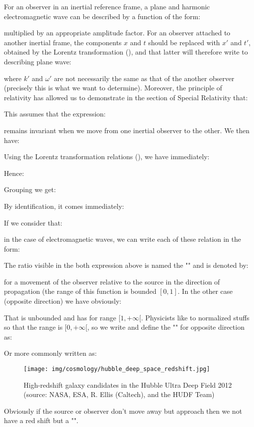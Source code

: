 	For an observer in an inertial reference frame, a plane and harmonic electromagnetic wave can be described by a function of the form:
	
	multiplied by an appropriate amplitude factor. For an observer attached to another inertial frame, the components $x$ and $t$ should be replaced with $x'$ and $t'$, obtained by the Lorentz transformation (), and that latter will therefore write to describing plane wave:
	
	where $k'$ and $\omega'$ are not necessarily the same as that of the another observer (precisely this is what we want to determine). Moreover, the principle of relativity has allowed us to demonstrate in the section of Special Relativity that:
	
	This assumes that the expression:
	
	remains invariant when we move from one inertial observer to the other. We then have:
	
	Using the Lorentz transformation relations (), we have immediately:
	
	Hence:
	
	Grouping we get:
	
	By identification, it comes immediately:
	
	If we consider that:
	
	in the case of electromagnetic waves, we can write each of these relation in the form:
	
	The ratio visible in the both expression above is named the "" and is denoted by:
	
	for a movement of the observer relative to the source in the direction of propagation (the range of this function is bounded $[0,1]$. In the other case (opposite direction) we have obviously:
	
	That is unbounded and has for range $[1,+\infty[$. Physicists like to normalized stuffs so that the range is $[0,+\infty[$, so we write and define the "" for opposite direction as:
	
	Or more commonly written as:
	
	
	\begin{figure}[H]
		\centering
		\texttt{[image: img/cosmology/hubble\_deep\_space\_redshift.jpg]}
		\caption[High-redshift galaxy candidates in the Hubble Ultra Deep Field 2012]{High-redshift galaxy candidates in the Hubble Ultra Deep Field 2012 (source: NASA, ESA, R. Ellis (Caltech), and the HUDF Team)}
	\end{figure}
	Obviously if the source or observer don't move away but approach then we not have a red shift but a "".
	
